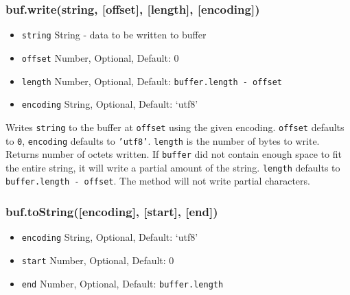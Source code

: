 \subsubsection{buf.write(string, {[}offset{]}, {[}length{]},
{[}encoding{]})}

\begin{itemize}
\item
  \texttt{string} String - data to be written to buffer
\item
  \texttt{offset} Number, Optional, Default: 0
\item
  \texttt{length} Number, Optional, Default:
  \texttt{buffer.length - offset}
\item
  \texttt{encoding} String, Optional, Default: `utf8'
\end{itemize}

Writes \texttt{string} to the buffer at \texttt{offset} using the given
encoding. \texttt{offset} defaults to \texttt{0}, \texttt{encoding}
defaults to \texttt{'utf8'}. \texttt{length} is the number of bytes to
write. Returns number of octets written. If \texttt{buffer} did not
contain enough space to fit the entire string, it will write a partial
amount of the string. \texttt{length} defaults to
\texttt{buffer.length - offset}. The method will not write partial
characters.

\begin{Shaded}
\begin{Highlighting}[]
 \NormalTok{);}
\NormalTok{(}\NormalTok{, }\NormalTok{);}
 \NormalTok{+ }\NormalTok{(}\NormalTok{, }
\end{Highlighting}
\end{Shaded}

\subsubsection{buf.toString({[}encoding{]}, {[}start{]}, {[}end{]})}

\begin{itemize}
\item
  \texttt{encoding} String, Optional, Default: `utf8'
\item
  \texttt{start} Number, Optional, Default: 0
\item
  \texttt{end} Number, Optional, Default: \texttt{buffer.length}
\end{itemize}


